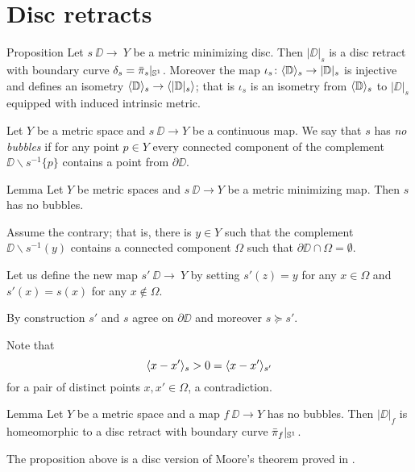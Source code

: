 \section{Disc retracts}\label{Metric minimizing discs}

\begin{thm}{Proposition}\label{prop:|D|}
Let $s\:\DD\to\ Y$ be a metric minimizing disc.
Then $|\DD|_s$ is a disc retract with boundary curve $\delta_s=\bar\pi_s|_{\mathbb{S}^1}$.
Moreover the map $\iota_s\colon\langle\mathbb{D}\rangle_s\to |\mathbb{D}|_s$ is injective and defines an isometry
$\langle\mathbb{D}\rangle_s\to \langle|\mathbb{D}|_s\rangle$;
that is $\iota_s$ is an isometry from $\langle\mathbb{D}\rangle_s$ to $|\DD|_s$ equipped with induced intrinsic metric.
\end{thm}

Let $Y$ be a metric space and
$s\:\DD\to Y$ be a continuous map.
We say that $s$ has \label{page:no-bubble}\emph{no bubbles}
if for any point $p\in Y$ every connected component of the complement $\DD\backslash s^{-1}\{p\}$ contains a point from $\partial \DD$.

\begin{thm}{Lemma}\label{prop:point-complement}
Let $Y$ be metric spaces and $s\:\DD\to Y$ be a metric minimizing map.
Then $s$ has no bubbles.
\end{thm}

Assume the contrary;
that is, there is $y\in Y$ such that the complement $\DD\backslash s^{-1}(y)$ contains a connected component $\Omega$ such that $\partial \DD\cap \Omega=\emptyset$.

Let us define the new map $s'\:\DD\to\ Y$ by setting $s'(z)=y$ for any $x\in \Omega$ and $s'(x)=s(x)$ for any $x\notin \Omega$.

By construction $s'$ and $s$ agree on $\partial\DD$ and moreover $s\succcurlyeq s'$.

Note that
\[\langle x-x'\rangle_{s}>0=\langle x-x'\rangle_{s'}\]
for a pair of distinct points $x,x'\in \Omega$, a contradiction.
\qeds



\begin{thm}{Lemma}\label{prop:disc-moore}
Let $Y$ be a metric space and a map $f\:\DD\to Y$ has no bubbles.
Then $|\DD|_f$ is homeomorphic to a disc retract with boundary curve $\bar\pi_f|_{\mathbb{S}^1}$.
\end{thm}

The proposition above is a disc version of Moore's theorem \cite{moore} proved in \cite{LW3}.

